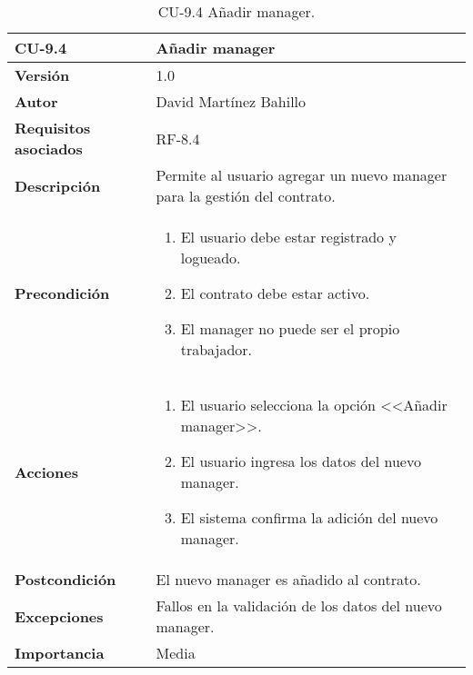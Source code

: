 \begin{table}[p]
	\centering
	\begin{tabularx}{\linewidth}{ p{} p{} }
		\toprule
		\textbf{CU-9.4}  & \textbf{Añadir manager}\\
		\midrule
		\textbf{Versión}              & 1.0    \\
		\textbf{Autor}                & David Martínez Bahillo \\
		\textbf{Requisitos asociados} & RF-8.4 \\
		\textbf{Descripción}          & Permite al usuario agregar un nuevo manager para la gestión del contrato. \\
		\textbf{Precondición}         &  
		\begin{enumerate}
			\item El usuario debe estar registrado y logueado.
			\item El contrato debe estar activo.
			\item El manager no puede ser el propio trabajador.
		\end{enumerate}\\
		\textbf{Acciones}             &
		\begin{enumerate}
			\item El usuario selecciona la opción <<Añadir manager>>.
			\item El usuario ingresa los datos del nuevo manager.
			\item El sistema confirma la adición del nuevo manager.
		\end{enumerate}\\
		\textbf{Postcondición}        & El nuevo manager es añadido al contrato. \\
		\textbf{Excepciones}          & Fallos en la validación de los datos del nuevo manager. \\
		\textbf{Importancia}          & Media \\
		\bottomrule
	\end{tabularx}
	\caption{CU-9.4 Añadir manager.}
\end{table}



